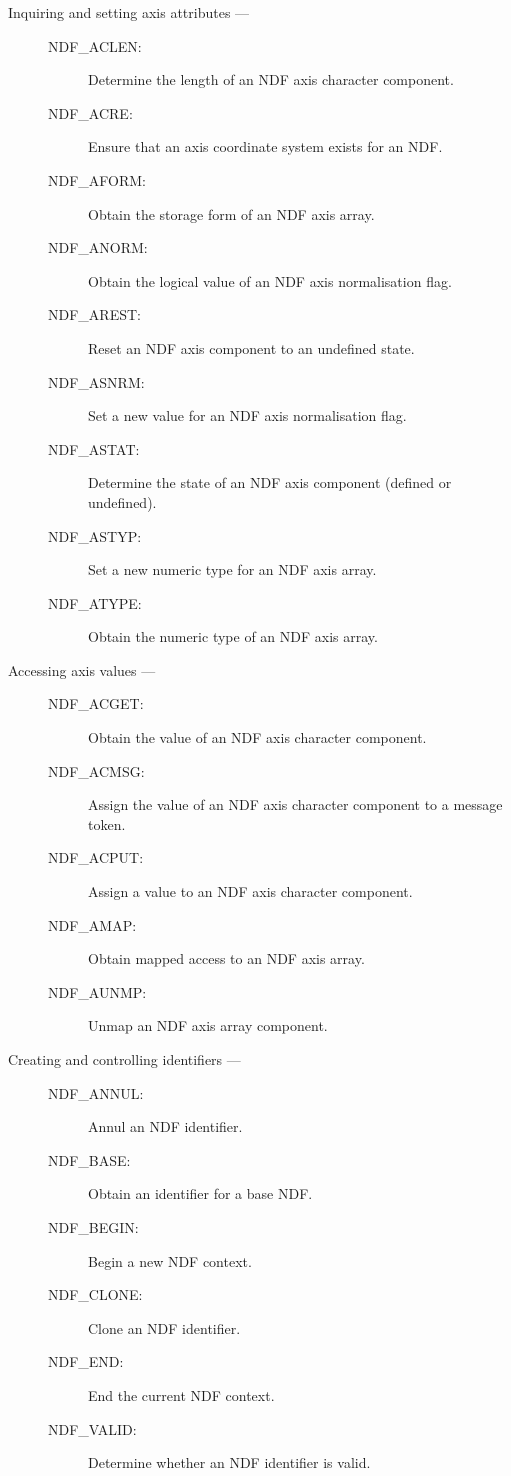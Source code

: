 \begin{description}
\item [Inquiring and setting axis attributes ---]

\begin{description}
\item [NDF\_ACLEN:]  Determine the length of an NDF axis character component.
\item [NDF\_ACRE:]  Ensure that an axis coordinate system exists for an NDF.
\item [NDF\_AFORM:]  Obtain the storage form of an NDF axis array.
\item [NDF\_ANORM:]  Obtain the logical value of an NDF axis normalisation flag.
\item [NDF\_AREST:]  Reset an NDF axis component to an undefined state.
\item [NDF\_ASNRM:]  Set a new value for an NDF axis normalisation flag.
\item [NDF\_ASTAT:]  Determine the state of an NDF axis component (defined or undefined).
\item [NDF\_ASTYP:]  Set a new numeric type for an NDF axis array.
\item [NDF\_ATYPE:]  Obtain the numeric type of an NDF axis array.
\end{description}

\item [Accessing axis values ---]

\begin{description}
\item [NDF\_ACGET:]  Obtain the value of an NDF axis character component.
\item [NDF\_ACMSG:]  Assign the value of an NDF axis character component to a message token.
\item [NDF\_ACPUT:]  Assign a value to an NDF axis character component.
\item [NDF\_AMAP:]  Obtain mapped access to an NDF axis array.
\item [NDF\_AUNMP:]  Unmap an NDF axis array component.
\end{description}

\item [Creating and controlling identifiers ---]

\begin{description}
\item [NDF\_ANNUL:]  Annul an NDF identifier.
\item [NDF\_BASE:]  Obtain an identifier for a base NDF.
\item [NDF\_BEGIN:]  Begin a new NDF context.
\item [NDF\_CLONE:]  Clone an NDF identifier.
\item [NDF\_END:]  End the current NDF context.
\item [NDF\_VALID:]  Determine whether an NDF identifier is valid.
\end{description}


\end{description}
